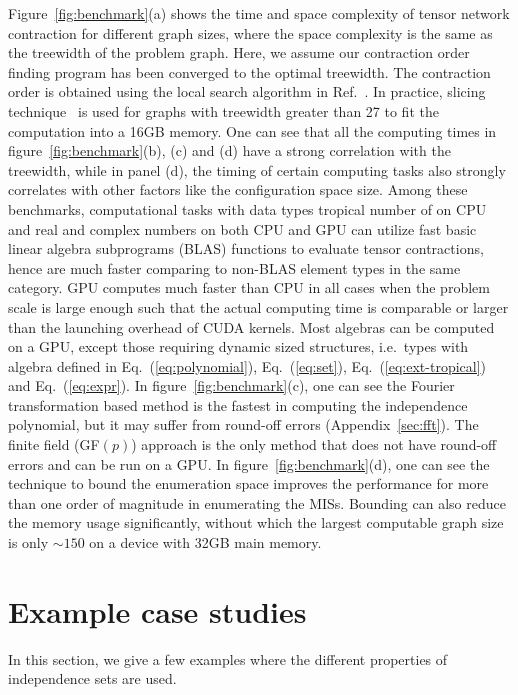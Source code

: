 \documentclass[onefignum, onetabnum]{siamart190516}
\newcommand{\<}{\langle}
\renewcommand{\>}{\rangle}
\newcommand{\Eq}[1]{Eq.~(\ref{#1})}
\newcommand{\App}[1]{Appendix~\ref{#1}}
\newcounter{example}
\begin{document}
Figure~\ref{fig:benchmark}(a) shows the time and space complexity of tensor network contraction for different graph sizes,
where the space complexity is the same as the treewidth of the problem graph.
Here, we assume our contraction order finding program has been converged to the optimal treewidth.
The contraction order is obtained using the local search algorithm in Ref.~\cite{Kalachev2021}.
In practice, slicing technique~\cite{Kalachev2021} is used for graphs with treewidth greater than 27 to fit the computation into a 16GB memory.
One can see that all the computing times in figure~\ref{fig:benchmark}(b), (c) and (d) have a strong correlation with the treewidth,
while in panel (d), the timing of certain computing tasks also strongly correlates with other factors like the configuration space size.
Among these benchmarks, computational tasks with data types tropical number of on CPU and real and complex numbers on both CPU and GPU can utilize fast basic linear algebra subprograms (BLAS) functions to evaluate tensor contractions, hence 
are much faster comparing to non-BLAS element types in the same category.
GPU computes much faster than CPU in all cases when the problem scale is large enough such that the actual computing time is comparable or larger than the launching overhead of CUDA kernels.
Most algebras can be computed on a GPU, except those requiring dynamic sized structures, i.e.\ types with algebra defined in \Eq{eq:polynomial}, \Eq{eq:set}, \Eq{eq:ext-tropical} and \Eq{eq:expr}.
In figure~\ref{fig:benchmark}(c), one can see the Fourier transformation based method is the fastest in computing the independence polynomial,
but it may suffer from round-off errors (\App{sec:fft}). The finite field (GF$(p)$) approach is the only method that does not have round-off errors and can be run on a GPU.
In figure~\ref{fig:benchmark}(d), one can see the technique to bound the enumeration space improves the performance for more than one order of magnitude in enumerating the MISs.
Bounding can also reduce the memory usage significantly, without which the largest computable graph size is only $\sim150$ on a device with 32GB main memory.

\section{Example case studies} \label{sec:examples}
In this section, we give a few examples where the different properties of independence sets are used.
\end{document}
